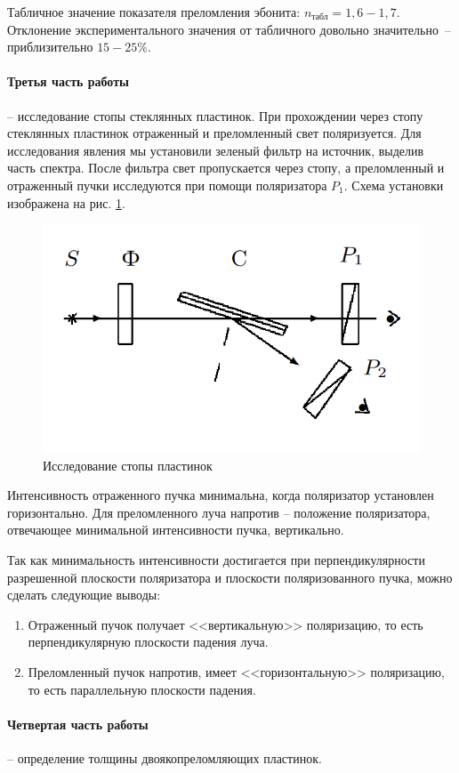 Табличное значение показателя преломления эбонита: $n_\text{табл} = 1,6-1,7$. Отклонение экспериментального значения от табличного довольно значительно~-- приблизительно $15-25\%$.

\paragraph{Третья часть работы} -- исследование стопы стеклянных пластинок.
При прохождении через стопу стеклянных пластинок отраженный и преломленный свет поляризуется. Для исследования явления мы установили зеленый фильтр на источник, выделив часть спектра. После фильтра свет пропускается через стопу, а преломленный и отраженный пучки исследуются при помощи поляризатора $P_1$. Схема установки изображена на рис. \ref{Stopa}. 

\begin{figure}[!hb]
	\centering
	\includegraphics[width=0.5\linewidth]{pics/Stopa.png}
	\caption{{Исследование стопы пластинок}}
	\label{Stopa}
\end{figure}

Интенсивность отраженного пучка минимальна, когда поляризатор установлен горизонтально. Для преломленного луча напротив -- положение поляризатора, отвечающее минимальной интенсивности пучка, вертикально. 

Так как минимальность интенсивности достигается при перпендикулярности разрешенной плоскости поляризатора и плоскости поляризованного пучка, можно сделать следующие выводы:
\begin{enumerate}
    \item Отраженный пучок получает <<вертикальную>> поляризацию, то есть перпендикулярную плоскости падения луча.
    \item Преломленный пучок напротив, имеет <<горизонтальную>> поляризацию, то есть параллельную плоскости падения.
\end{enumerate}

\paragraph{Четвертая часть работы} -- определение толщины двоякопреломляющих пластинок. 

